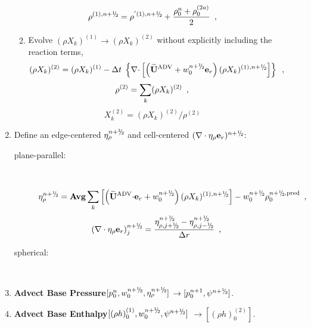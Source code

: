 \begin{description}
\begin{enumerate}
\begin{enumerate}
\begin{equation}
\rho^{(1),\nph} = \rho^{'(1),\nph} + \frac{\rho_0^n + \rho_0^{(2a)}}{2}\enskip ,
\end{equation}

    \item Evolve $(\rho X_k)^{(1)} \rightarrow (\rho X_k)^{(2)}$
      without explicitly including the reaction terms,
\begin{equation}
(\rho X_k)^{(2)} = (\rho X_k)^{(1)} 
- \dt \; \left\{ \nablab \cdotb \left[\left(\uadvtwo+w_0^{\nph} \er\right)  
(\rho X_k)^{(1),\nph} \right] \right\}  \enskip ,
\end{equation}
\begin{equation}
\rho^{(2)} = \sum_k (\rho X_k)^{(2)} \enskip ,
\end{equation}
\begin{equation}
X_k^{(2)} = (\rho X_k)^{(2)} / \rho^{(2)}
\end{equation}

\end{enumerate}

\item Define an edge-centered $\etarho^{\nph}$ and cell-centered 
$(\nabla\cdot\etarho\er)^{\nph}$:

\begin{description}

\item[plane-parallel:] ~

\begin{equation}
 \etarho^{\nph} = {\rm {\bf Avg}} \sum_k \left [\left(\uadvtwo \cdotb \er + w_0^{\nph}\right) (\rho X_k)^{(1),\nph} \right] - w_0^{\nph} \rho_0^{\nph,{\rm pred}} \enskip ,
\end{equation}
\begin{equation}
(\nabla\cdot\etarho\er)_j^{\nph} = \frac{\eta_{\rho,j+\myhalf}^{\nph} - \eta_{\rho,j-\myhalf}^{\nph}}{\Delta r} \enskip , \\
\end{equation}

\item[spherical:]~

\end{description}

\item {\bf Advect Base Pressure}$[p_0^{n}, w_0^{\nph}, \etarho^{n+\myhalf}]$ 
$\rightarrow [p_0^{n+1}, \psi^{n+\myhalf}]$.

\item {\bf Advect Base Enthalpy}$[(\rho h)_0^{(1)}, w_0^{\nph}, \psi^{\nph}]$ 
$\rightarrow [(\rho h)_0^{(2)}]$.


\end{enumerate}
\end{description}

